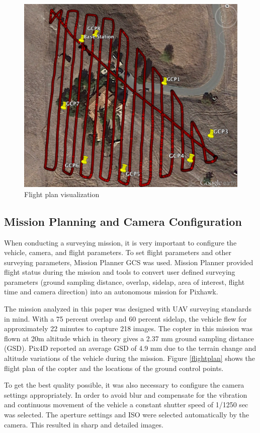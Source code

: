 \documentclass{article}
\begin{document}
\begin{figure}
\centering
\includegraphics[width=5in]{images/flight_plan_gcp.png}
\caption{Flight plan visualization}
\label{fig:flightplan}
\end{figure}

\subsection{Mission Planning and Camera Configuration}
When conducting a surveying mission, it is very important to configure the vehicle, camera, and
flight parameters. To set flight parameters and other surveying parameters, Mission Planner GCS was
used. Mission Planner provided flight status during the mission and tools to convert user defined
surveying parameters (ground sampling distance, overlap, sidelap, area of interest, flight time and
camera direction) into an autonomous mission for Pixhawk.

The mission analyzed in this paper was designed with UAV surveying standards in mind. With a 75
percent overlap and 60 percent sidelap, the vehicle flew for approximately 22 minutes to capture
218 images. The copter in this mission was flown at 20m altitude which in theory gives a 2.37 mm
ground sampling distance (GSD). Pix4D reported an average GSD of 4.9 mm due to the terrain change and altitude variations of
the vehicle during the mission. Figure \ref{flightplan} shows the flight plan of the copter and the
locations of the ground control points.

To get the best quality possible, it was also necessary to configure the camera settings
appropriately. In order to avoid blur and compensate for the vibration and continuous movement of the vehicle
a constant shutter speed of 1/1250 sec was selected. The aperture settings and ISO were
selected automatically by the camera. This resulted in sharp and detailed images.
\end{document}
